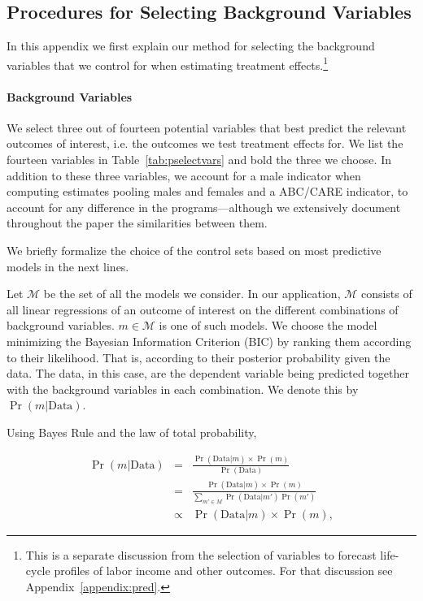 \subsection{Procedures for Selecting Background Variables} \label{appendix:results}

\noindent In this appendix we first explain our method for selecting the background variables that we control for when estimating treatment effects.\footnote{This is a separate discussion from the selection of variables to forecast life-cycle profiles of labor income and other outcomes. For that discussion see Appendix~\ref{appendix:pred}.}

\paragraph{Background Variables} \label{appendix:bvariables}

\noindent We select three out of fourteen potential variables that best predict the relevant outcomes of interest, i.e. the outcomes we test treatment effects for. We list the fourteen variables in Table~\ref{tab:pselectvars} and bold the three we choose. In addition to these three variables, we account for a male indicator when computing estimates pooling males and females and a ABC/CARE indicator, to account for any difference in the programs---although we extensively document throughout the paper the similarities between them.

\singlespacing

\doublespacing

\noindent We briefly formalize the choice of the control sets based on most predictive models in the next lines.

\noindent Let $\mathcal{M}$ be the set of all the models we consider. In our application, $\mathcal{M}$ consists of all linear regressions of an outcome of interest on the different combinations of background variables. $m \in \mathcal{M}$ is one of such models. We choose the model minimizing the Bayesian Information Criterion (BIC) by ranking them according to their likelihood. That is, according to their posterior probability given the data. The data, in this case, are the dependent variable being predicted together with the background variables in each combination. We denote this by $\Pr( m | \text{Data} )$.

\pagebreak
\noindent Using Bayes Rule and the law of total probability,

\begin{eqnarray}
\Pr( m | \text{Data} ) &=& \frac{\Pr(\text{Data} | m)\times \Pr(m)}{ \Pr(\text{Data})}\\ \nonumber
&=& \frac{\Pr(\text{Data} | m)\times \Pr(m)}{\sum \limits _{m' \in M} \Pr (\text{Data} | m') \Pr(m')} \\ \nonumber
&\propto& \Pr (\text{Data} | m) \times \Pr(m),
\end{eqnarray}

